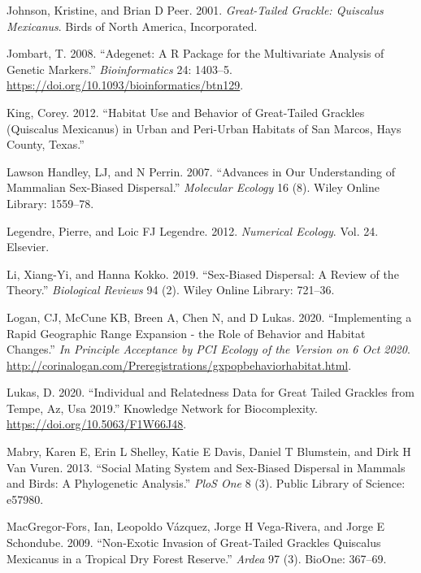 \documentclass[]{article}
\begin{document}
\leavevmode\hypertarget{ref-johnson2001great}{}%
Johnson, Kristine, and Brian D Peer. 2001. \emph{Great-Tailed Grackle:
Quiscalus Mexicanus}. Birds of North America, Incorporated.

\leavevmode\hypertarget{ref-Jombart2008adegenet}{}%
Jombart, T. 2008. ``Adegenet: A R Package for the Multivariate Analysis
of Genetic Markers.'' \emph{Bioinformatics} 24: 1403--5.
\url{https://doi.org/10.1093/bioinformatics/btn129}.

\leavevmode\hypertarget{ref-king2012habitat}{}%
King, Corey. 2012. ``Habitat Use and Behavior of Great-Tailed Grackles
(Quiscalus Mexicanus) in Urban and Peri-Urban Habitats of San Marcos,
Hays County, Texas.''

\leavevmode\hypertarget{ref-lawson2007advances}{}%
Lawson Handley, LJ, and N Perrin. 2007. ``Advances in Our Understanding
of Mammalian Sex-Biased Dispersal.'' \emph{Molecular Ecology} 16 (8).
Wiley Online Library: 1559--78.

\leavevmode\hypertarget{ref-legendre2012numerical}{}%
Legendre, Pierre, and Loic FJ Legendre. 2012. \emph{Numerical Ecology}.
Vol. 24. Elsevier.

\leavevmode\hypertarget{ref-li2019sex}{}%
Li, Xiang-Yi, and Hanna Kokko. 2019. ``Sex-Biased Dispersal: A Review of
the Theory.'' \emph{Biological Reviews} 94 (2). Wiley Online Library:
721--36.

\leavevmode\hypertarget{ref-logan2020xpop}{}%
Logan, CJ, McCune KB, Breen A, Chen N, and D Lukas. 2020. ``Implementing
a Rapid Geographic Range Expansion - the Role of Behavior and Habitat
Changes.'' \emph{In Principle Acceptance by PCI Ecology of the Version
on 6 Oct 2020}.
\url{http://corinalogan.com/Preregistrations/gxpopbehaviorhabitat.html}.

\leavevmode\hypertarget{ref-lukas2020geneticdata}{}%
Lukas, D. 2020. ``Individual and Relatedness Data for Great Tailed
Grackles from Tempe, Az, Usa 2019.'' Knowledge Network for
Biocomplexity. \url{https://doi.org/10.5063/F1W66J48}.

\leavevmode\hypertarget{ref-mabry2013social}{}%
Mabry, Karen E, Erin L Shelley, Katie E Davis, Daniel T Blumstein, and
Dirk H Van Vuren. 2013. ``Social Mating System and Sex-Biased Dispersal
in Mammals and Birds: A Phylogenetic Analysis.'' \emph{PloS One} 8 (3).
Public Library of Science: e57980.

\leavevmode\hypertarget{ref-macgregor2009non}{}%
MacGregor-Fors, Ian, Leopoldo Vázquez, Jorge H Vega-Rivera, and Jorge E
Schondube. 2009. ``Non-Exotic Invasion of Great-Tailed Grackles
Quiscalus Mexicanus in a Tropical Dry Forest Reserve.'' \emph{Ardea} 97
(3). BioOne: 367--69.
\end{document}
